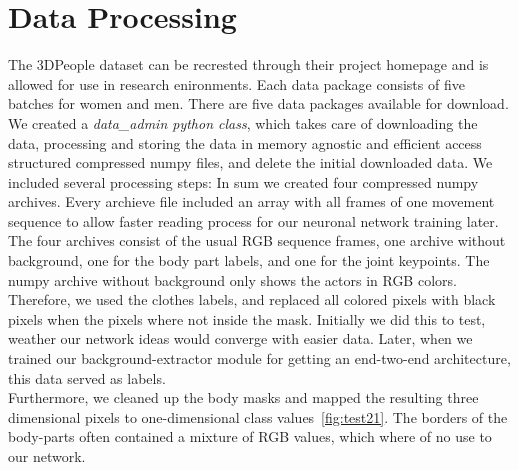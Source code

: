 \section{Data Processing}
The 3DPeople dataset can be recrested through their project homepage and is allowed for use in research
enironments.
Each data package consists of five batches for women and men. There are five data packages available for download.
We created a \textit{data\_admin python class}, which takes care of downloading the data, processing and storing the
data
in memory agnostic and efficient access structured compressed numpy files, and delete the initial downloaded data.
We included several processing steps:
In sum we created four compressed numpy archives.
Every archieve file included an array with all frames of one movement sequence to allow faster reading process for
our neuronal network training later.
The four archives consist of the usual RGB sequence frames, one archive without background, one for the body part
labels,
and one for the joint keypoints.
The numpy archive without background only shows the actors in RGB colors.
Therefore, we used the clothes labels, and replaced all colored pixels with black pixels when the pixels where not
inside the mask.
Initially we did this to test, weather our network ideas would converge with easier data.
Later, when we trained our background-extractor module for getting an end-two-end architecture, this data served as
labels.\\
Furthermore, we cleaned up the body masks and mapped the resulting three dimensional pixels to one-dimensional class
values~\autoref{fig:test21}.
The borders of the body-parts often contained a mixture of RGB values, which where of no use to our network.\\
